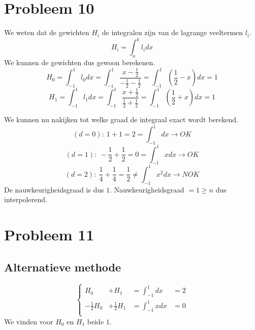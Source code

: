 \documentclass[12pt,a4paper]{article}
\begin{document}
\section{Probleem 10}
We weten dat de gewichten $H_i$ de integralen zijn van de lagrange veeltermen $l_i$.
\[
H_i = \int_{a}^{b}l_idx
\]
We kunnen de gewichten dus gewoon berekenen.
\[
H_0 = \int_{-1}^{1}l_{0}dx = \int_{-1}^{1}\frac{x - \frac{1}{2}}{-\frac{1}{2}-\frac{1}{2}} = \int_{-1}^{1}\left(\frac{1}{2}-x\right)dx = 1
\]
\[
H_1 = \int_{-1}^{1}l_{1}dx = \int_{-1}^{1}\frac{x + \frac{1}{2}}{\frac{1}{2}+\frac{1}{2}} = \int_{-1}^{1}\left(\frac{1}{2}+x\right)dx = 1
\]

We kunnen nu nakijken tot welke graad de integraal exact wordt berekend.
\[
(d=0):\ 1+1=2=\int_{-1}^{1}dx \rightarrow OK
\]
\[
(d=1):\ -\frac{1}{2}+\frac{1}{2}=0=\int_{-1}^{1}xdx \rightarrow OK
\]
\[
(d=2):\ \frac{1}{4}+\frac{1}{4}=\frac{1}{2}\neq\int_{-1}^{1}x^2dx \rightarrow NOK
\]
De nauwkeurigheidsgraad is dus $1$.
Nauwkeurigheidsgraad $ = 1 \ge n$ dus interpolerend.

\section{Probleem 11}

\subsection*{Alternatieve methode}
\[
\left\{
\begin{array}{cccc}
H_0 &+ H_1 &= \int_{-1}^{1}dx &= 2\\
-\frac{1}{2}H_0 &+ \frac{1}{2}H_1 &= \int_{-1}^{1}xdx &= 0\\
\end{array}
\right.
\]
We vinden voor $H_0$ en $H_1$ beide $1$.
\end{document}
